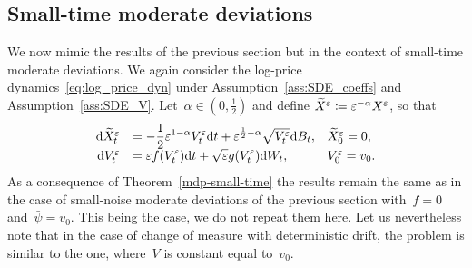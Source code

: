 


\subsection{Small-time moderate deviations}
We now mimic the results of the previous section but in the context of small-time moderate deviations. We again consider the log-price dynamics~\eqref{eq:log_price_dyn} under  Assumption~\ref{ass:SDE_coeffs} and Assumption~\ref{ass:SDE_V}.
Let~$\alpha \in (0,\frac{1}{2})$ and define 
${\widetilde{X}^\varepsilon \coloneqq \varepsilon^{-\alpha} X^{\varepsilon}}$, so that
\begin{equation*}
\begin{array}{rll}
\mathrm{d}\widetilde{X}^\varepsilon_t
&= \displaystyle -\frac{1}{2}\varepsilon^{1-\alpha} V_t^{\varepsilon} \mathrm{d} t + \varepsilon^{\frac{1}{2}-\alpha}\sqrt{V_t^\varepsilon}\mathrm{d} B_t, 
& \widetilde{X}_0^\varepsilon = 0, \\
\mathrm{d} V_t^\varepsilon &= \displaystyle\varepsilon f(V_t^\varepsilon)\mathrm{d} t + \sqrt{\varepsilon}g(V_t^\varepsilon)\mathrm{d} W_t,  & V_0^\varepsilon = v_0.
\end{array}
\end{equation*}
As a consequence of Theorem~\ref{mdp-small-time} the results remain the same as in the case of small-noise moderate deviations of the previous section with~$f = 0$ and~$\bar\psi = v_0$. This being the case, we do not repeat them here. Let us nevertheless note that in the case of change of measure with deterministic drift, the problem is similar to the one, where~$V$ is constant equal to~$v_0$.
